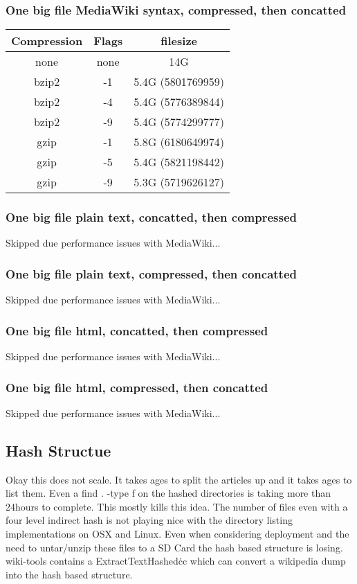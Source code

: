 \documentclass{article}
\begin{document}
\subsubsection{One big file MediaWiki syntax, compressed, then concatted}
\begin{tabular}{|c|c|c|}
\hline
Compression & Flags & filesize \\ \hline
none & none & 14G \\ \hline
bzip2 & -1 & 5.4G (5801769959) \\ \hline
bzip2 & -4 & 5.4G (5776389844) \\ \hline
bzip2 & -9 & 5.4G (5774299777) \\ \hline
gzip  & -1 & 5.8G (6180649974) \\ \hline
gzip  & -5 & 5.4G (5821198442) \\ \hline
gzip  & -9 & 5.3G (5719626127) \\ \hline
\end{tabular}

\subsubsection{One big file plain text, concatted, then compressed}
Skipped due performance issues with MediaWiki...
\subsubsection{One big file plain text, compressed, then concatted}
Skipped due performance issues with MediaWiki...
\subsubsection{One big file html, concatted, then compressed}
Skipped due performance issues with MediaWiki...
\subsubsection{One big file html, compressed, then concatted}
Skipped due performance issues with MediaWiki...

\subsection{Hash Structue}
Okay this does not scale. It takes ages to split the articles up and it takes
ages to list them. Even a find . -type f on the hashed directories is taking more
than 24hours to complete. This mostly kills this idea. The number of files even
with a four level indirect hash is not playing nice with the directory listing
implementations on OSX and Linux. Even when considering deployment and the need
to untar/unzip these files to a SD Card the hash based structure is losing.\\
wiki-tools contains a ExtractTextHashed\.cc which can convert a wikipedia dump
into the hash based structure.
\end{document}

